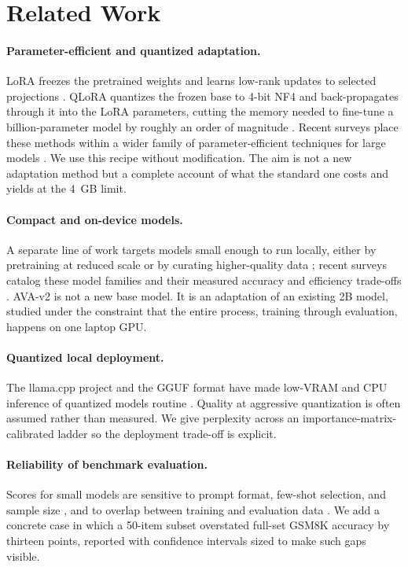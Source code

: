 \section{Related Work}

\paragraph{Parameter-efficient and quantized adaptation.}
LoRA freezes the pretrained weights and learns low-rank updates to selected projections \citep{hu2021lora}. QLoRA quantizes the frozen base to 4-bit NF4 and back-propagates through it into the LoRA parameters, cutting the memory needed to fine-tune a billion-parameter model by roughly an order of magnitude \citep{dettmers2023qlora}. Recent surveys place these methods within a wider family of parameter-efficient techniques for large models \citep{prottasha2025peft}. We use this recipe without modification. The aim is not a new adaptation method but a complete account of what the standard one costs and yields at the 4~GB limit.

\paragraph{Compact and on-device models.}
A separate line of work targets models small enough to run locally, either by pretraining at reduced scale or by curating higher-quality data \citep{zhang2024tinyllama,gunasekar2023textbooks}; recent surveys catalog these model families and their measured accuracy and efficiency trade-offs \citep{lu2025slmsurvey}. AVA-v2 is not a new base model. It is an adaptation of an existing 2B model, studied under the constraint that the entire process, training through evaluation, happens on one laptop GPU.

\paragraph{Quantized local deployment.}
The llama.cpp project and the GGUF format have made low-VRAM and CPU inference of quantized models routine \citep{gerganov2023llamacpp}. Quality at aggressive quantization is often assumed rather than measured. We give perplexity across an importance-matrix-calibrated ladder so the deployment trade-off is explicit.

\paragraph{Reliability of benchmark evaluation.}
Scores for small models are sensitive to prompt format, few-shot selection, and sample size \citep{biderman2024lessons}, and to overlap between training and evaluation data \citep{tong2026contamination}. We add a concrete case in which a 50-item subset overstated full-set GSM8K accuracy by thirteen points, reported with confidence intervals sized to make such gaps visible.

